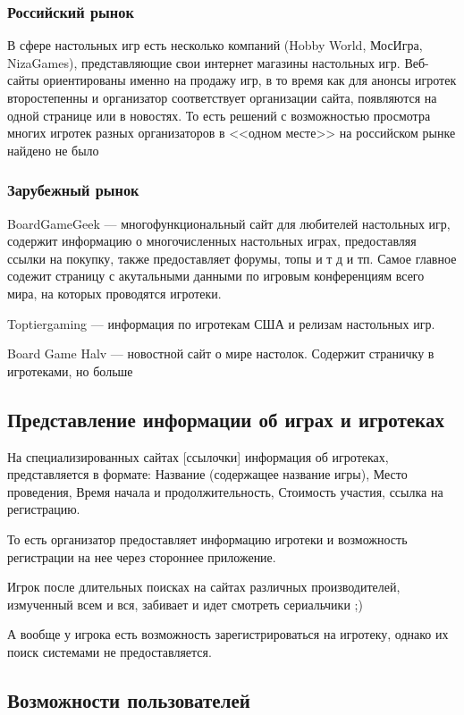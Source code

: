 \subsubsection{Российский рынок}

В сфере настольных игр есть несколько компаний (Hobby World, МосИгра,
NizaGames), представляющие свои интернет магазины настольных игр. Веб-сайты
ориентированы именно на продажу игр, в то время как для анонсы игротек
второстепенны и организатор соответствует организации сайта, появляются на одной
странице или в новостях. То есть решений с возможностью просмотра многих игротек
разных организаторов в <<одном месте>> на российском рынке найдено не было

\subsubsection{Зарубежный рынок}

BoardGameGeek --- многофункциональный сайт для любителей настольных игр,
содержит информацию о многочисленных настольных играх, предоставляя ссылки на
покупку, также предоставляет форумы, топы и т д и тп. Самое главное содежит
страницу с акутальными данными по игровым конференциям всего мира, на которых
проводятся игротеки.

Toptiergaming --- информация по игротекам США и релизам настольных игр.

Board Game Halv --- новостной сайт о мире настолок. Содержит страничку в
игротеками, но больше

\subsection{Представление информации об играх и игротеках}

На специализированных сайтах [ссылочки] информация об игротеках, представляется
в формате: Название (содержащее название игры), Место проведения, Время начала и продолжительность,
Стоимость участия, ссылка на регистрацию.

То есть организатор предоставляет информацию игротеки и возможность регистрации
на нее через стороннее приложение.

Игрок после длительных поисках на сайтах различных производителей, измученный
всем и вся, забивает и идет смотреть сериальчики ;)

А вообще у игрока есть возможность зарегистрироваться на игротеку, однако их
поиск системами не предоставляется.

\subsection{Возможности пользователей}

